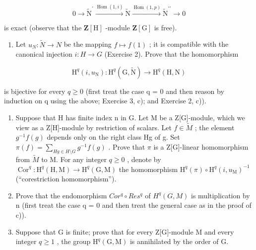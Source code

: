 \[
0 \longrightarrow \widetilde {\mathrm{N}} ^ {\prime} \xrightarrow {\operatorname{Hom} (1 , i)} \widetilde {\mathrm{N}} \xrightarrow {\operatorname{Hom} (1 , p)} \widetilde {\mathrm{N}} ^ {\prime \prime} \longrightarrow 0
\]

is exact (observe that the \(\mathbf{Z}[\mathrm{H}]\) -module \(\mathbf{Z}[\mathrm{G}]\) is free).

\begin{enumerate}
\def\labelenumi{\alph{enumi})}
\setcounter{enumi}{2}
\tightlist
\item
  Let \(u_{N} : \widetilde{N} \to N\) be the mapping \(f \mapsto f(1)\) ; it is compatible with the canonical injection \(i : H \to G\) (Exercise 2). Prove that the homomorphism
\end{enumerate}

\[
\mathrm{H} ^ {q} (i, u _ {\mathrm{N}}): \mathrm{H} ^ {q} (\mathrm{G}, \widetilde {\mathrm{N}}) \to \mathrm{H} ^ {q} (\mathrm{H}, \mathrm{N})
\]

is bijective for every \(q \geqslant 0\) (first treat the case q = 0 and then reason by induction on q using the above; Exercise 3, c); and Exercise 2, c)).

\begin{enumerate}
\def\labelenumi{\alph{enumi})}
\setcounter{enumi}{3}
\item
  Suppose that H has finite index n in G. Let M be a Z{[}G{]}-module, which we view as a Z{[}H{]}-module by restriction of scalars. Let \(f \in \widetilde{M}\) ; the element \(g^{-1}f(g)\) depends only on the right class Hg of g. Set \(\pi(f) = \sum_{Hg \in H \setminus G} g^{-1}f(g)\) . Prove that \(\pi\) is a Z{[}G{]}-linear homomorphism from \(\widetilde{M}\) to M. For any integer \(q \geqslant 0\) , denote by \(\operatorname{Cor}^{q}: \mathrm{H}^{q}(\mathrm{H}, \mathrm{M}) \to \mathrm{H}^{q}(\mathrm{G}, \mathrm{M})\) the homomorphism \(\mathrm{H}^{q}(\pi) \circ \mathrm{H}^{q}(i, u_{\mathrm{M}})^{-1}\) (``corestriction homomorphism'').
\item
  Prove that the endomorphism \(Cor^{q} \circ Res^{q}\) of \(H^{q}(G, M)\) is multiplication by n (first treat the case q = 0 and then treat the general case as in the proof of c)).
\item
  Suppose that G is finite; prove that for every Z{[}G{]}-module M and every integer \(q \geqslant 1\) , the group \(\mathrm{H}^{q}(\mathrm{G}, \mathrm{M})\) is annihilated by the order of G.
\end{enumerate}

